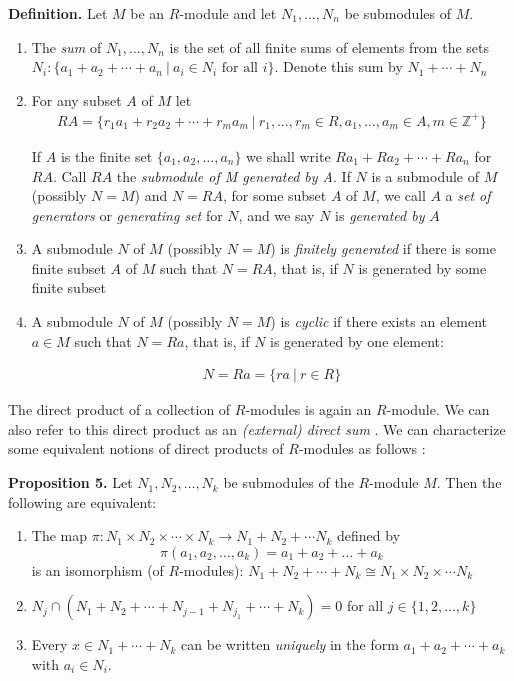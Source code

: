 \documentclass[11pt, reqno]{amsart}
\theoremstyle{plain}
\theoremstyle{definition}
\theoremstyle{example}
\begin{document}
\par
\textbf{Definition.} Let $M$ be an $R$-module and let $N_1, \ldots, N_n$ be submodules of $M$.
\begin{enumerate}
\item The \textit{sum} of $N_1, \ldots, N_n$ is the set of all finite sums of elements from the sets $N_i: \{a_1 + a_2 + \cdots + a_n \  | \ a_i \in N_i \text{ for all } i\}$. Denote this sum by $N_1 + \cdots + N_n$
\item For any subset $A$ of $M$ let
\begin{align*}
RA = \{r_1 a_1 + r_2a_2 + \cdots + r_ma_m \ | \ r_1, \ldots, r_m \in R, a_1, \ldots, a_m \in A, m \in \mathbb{Z}^+\}
\end{align*}

If $A$ is the finite set $\{a_1, a_2, \ldots, a_n\}$ we shall write $Ra_1 + Ra_2 + \cdots + Ra_n$ for $RA$. Call $RA$ the \textit{submodule of M generated by A}. If $N$ is a submodule of $M$ (possibly $N = M$) and $N = RA$, for some subset $A$ of $M$, we call $A$ a \textit{set of generators} or \textit{generating set} for $N$, and we say $N$ is \textit{generated by} $A$

\item A submodule $N$ of $M$ (possibly $N = M$) is \textit{finitely generated} if there is some finite subset $A$ of $M$ such that $N = RA$, that is, if $N$ is generated by some finite subset

\item A submodule $N$ of $M$ (possibly $N = M$) is \textit{cyclic} if there exists an element $a \in M$ such that $N = Ra$, that is, if $N$ is generated by one element:

\begin{align*}
N = Ra = \{ra \ | \ r \in R\}
\end{align*}
\end{enumerate} 

The direct product of a collection of $R$-modules is again an $R$-module. We can also refer to this direct product as an \textit{(external) direct sum} \cite[\S 10.3, p. 353]{dummit}. We can characterize some equivalent notions of direct products of $R$-modules as follows \cite[\S 10.3, p. 353]{dummit}:

\par
\textbf{Proposition 5.} Let $N_1, N_2, \ldots, N_k$ be submodules of the $R$-module $M$. Then the following are equivalent:
\begin{enumerate}
\item The map $\pi: N_1 \times N_2 \times \cdots \times N_k \to N_1 + N_2 + \cdots N_k$ defined by $$\pi(a_1, a_2, \ldots, a_k) = a_1 + a_2 + \ldots + a_k$$ is an isomorphism (of $R$-modules): $N_1 + N_2 + \cdots + N_k \cong N_1 \times N_2 \times \cdots N_k$
\item $N_j \cap (N_1 + N_2 + \cdots + N_{j-1} + N_{j_1} + \cdots + N_k) = 0$ for all $j \in \{1, 2, \ldots, k\}$
\item Every $x \in N_1 + \cdots + N_k$ can be written \textit{uniquely} in the form $a_1 + a_2 + \cdots + a_k$ with $a_i \in N_i$.
\end{enumerate}
\end{document}
